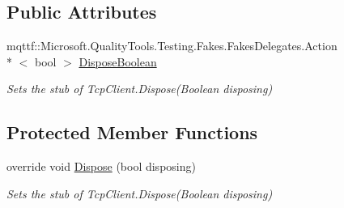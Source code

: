 \subsection*{Public Attributes}
\begin{DoxyCompactItemize}
\item 
mqttf\-::\-Microsoft.\-Quality\-Tools.\-Testing.\-Fakes.\-Fakes\-Delegates.\-Action\\*
$<$ bool $>$ \hyperlink{class_system_1_1_net_1_1_sockets_1_1_fakes_1_1_stub_tcp_client_a4722759a7c6c44447333936ac64c4071}{Dispose\-Boolean}
\begin{DoxyCompactList}\small\item\em Sets the stub of Tcp\-Client.\-Dispose(\-Boolean disposing)\end{DoxyCompactList}\end{DoxyCompactItemize}
\subsection*{Protected Member Functions}
\begin{DoxyCompactItemize}
\item 
override void \hyperlink{class_system_1_1_net_1_1_sockets_1_1_fakes_1_1_stub_tcp_client_a1fa3c26cb4de64eb3c9169be7695d45f}{Dispose} (bool disposing)
\begin{DoxyCompactList}\small\item\em Sets the stub of Tcp\-Client.\-Dispose(\-Boolean disposing)\end{DoxyCompactList}\end{DoxyCompactItemize}
